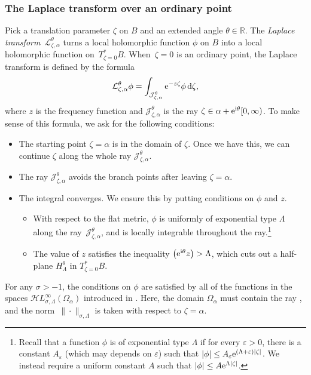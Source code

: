 \documentclass[pdftex]{sigma}
\let\Re\relax
\DeclareMathOperator{\Re}{Re}
\newcommand{\singexp}[2]{\mathcal{H}L^\infty_{#1, #2}}
\newcommand{\R}{\mathbb{R}}
\newcommand{\laplace}{\mathcal{L}}
\numberwithin{equation}{section}
\begin{document}
\subsubsection{The Laplace transform over an ordinary point}\label{laplace:ordinary}
%
Pick a translation parameter $\zeta$ on $B$ and an extended angle $\theta \in \R$. The {\em Laplace transform}~$\laplace_{\zeta, \alpha}^\theta$ turns a local holomorphic function $\phi$ on $B$ into a local holomorphic function on~$T^*_{\zeta = 0} B$. When~${\zeta = 0}$ is an ordinary point, the Laplace transform is defined by the formula
\begin{equation}\label{laplace:int}
\laplace_{\zeta, \alpha}^\theta \phi = \int_{\mathcal{J}_{\zeta, \alpha}^\theta} {\rm e}^{-z\zeta} \phi \,{\rm d}\zeta,
\end{equation}
where $z$ is the frequency function and $\mathcal{J}_{\zeta, \alpha}^\theta$ is the ray $\zeta \in \alpha + {\rm e}^{{\rm i}\theta} [0, \infty)$. To make sense of this formula, we ask for the following conditions:
\begin{itemize}\itemsep=0pt
\item The starting point $\zeta = \alpha$ is in the domain of $\zeta$. Once we have this, we can continue $\zeta$ along the whole ray $\mathcal{J}_{\zeta, \alpha}^\theta$.
\item The ray $\mathcal{J}_{\zeta, \alpha}^\theta$ avoids the branch points after leaving $\zeta = \alpha$.
\item The integral converges. We ensure this by putting conditions on $\phi$ and $z$.
\begin{itemize}\itemsep=0pt
\item With respect to the flat metric, $\phi$ is uniformly of exponential type $\Lambda$ along the ray~$\mathcal{J}_{\zeta, \alpha}^\theta$, and is locally integrable throughout the ray.\footnote{Recall that a function $\phi$ is of exponential type $\Lambda$ if for every $\varepsilon>0$, there is a constant $A_\varepsilon$ (which may depends on $\varepsilon$) such that $|\phi|\le A_\varepsilon {\rm e}^{(\Lambda+\varepsilon)|\zeta|}$. We instead require a uniform constant $A$ such that $|\phi| \le A {\rm e}^{\Lambda|\zeta|}$.}
\item The value of $z$ satisfies the inequality $\Re\bigl({\rm e}^{{\rm i}\theta} z\bigr) > \Lambda$, which cuts out a half-plane $H^\theta_\Lambda$ in $T^*_{\zeta = 0} B$.
\end{itemize}
\end{itemize}
For any $\sigma > -1$, the conditions on $\phi$ are satisfied by all of the functions in the spaces $\singexp{\sigma}{\Lambda}(\Omega_\alpha)$ introduced in \cite[Definition~2.3]{reg-sing-volterra}. Here, the domain $\Omega_\alpha$ must contain the ray , and the norm~$\|\cdot\|_{\sigma, \Lambda}$ is taken with respect to $\zeta = \alpha$.
\end{document}
